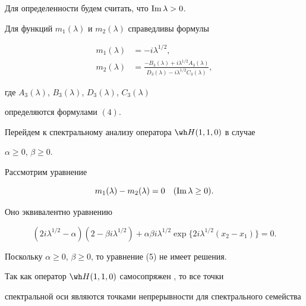  


Для определенности будем считать, что $\operatorname{Im}\lambda>0$. 


 


\begin{thm} 


Для функций $m_1(\lambda)$ и $m_2(\lambda)$ справедливы формулы 


\begin{align*} 


m_1(\lambda)&=-i\lambda^{1/2},\\ 


m_2(\lambda)&=\frac{-B_3(\lambda)+i\lambda^{1/2}A_3(\lambda)} 


{D_3(\lambda)-i\lambda^{1/2}C_3(\lambda)}, 


\end{align*} 


где $A_3(\lambda)$, $B_3(\lambda)$, $D_3(\lambda)$, $C_3(\lambda)$ 


определяются формулами $(4)$. 


\end{thm} 


 


Перейдем к спектральному анализу оператора $\wh H(1,1,0)$ в случае 


$\alpha\ge0$, $\beta\ge0$. 


 


Рассмотрим уравнение 


$$ 


m_1(\lambda)-m_2(\lambda)=0\quad (\im\lambda\ge0). 


$$ 


Оно эквивалентно уравнению 


\begin{equation} 


(2i\lambda^{1/2}-\alpha)(2-\beta i\lambda^{1/2})+ 


\alpha\beta i\lambda^{1/2}\exp\{2i\lambda^{1/2} 


(x_2-x_1)\}=0. 


\end{equation} 


Поскольку $\alpha\ge0$, $\beta\ge0$, то уравнение (5) не имеет решения. 


Так как оператор $\wh H(1,1,0)$ самосопряжен \cite{2}, то все точки 


спектральной оси являются точками непрерывности для спектрального семейства 


